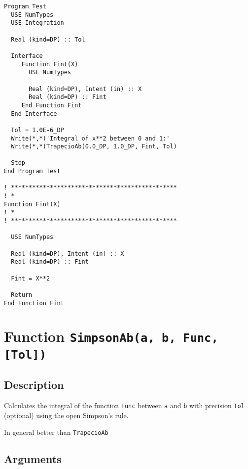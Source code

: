 \begin{lstlisting}[emph=TrapecioAB,
                   emphstyle=\color{blue},
                   frame=trBL,
                   caption=Integrating a function using the open
                   trapezoid rule.,
                   label=trapecioab]
Program Test
  USE NumTypes
  USE Integration

  Real (kind=DP) :: Tol

  Interface 
     Function Fint(X)
       USE NumTypes

       Real (kind=DP), Intent (in) :: X
       Real (kind=DP) :: Fint
     End Function Fint
  End Interface

  Tol = 1.0E-6_DP
  Write(*,*)'Integral of x**2 between 0 and 1:'
  Write(*,*)TrapecioAb(0.0_DP, 1.0_DP, Fint, Tol)

  Stop
End Program Test

! ***********************************************
! *
Function Fint(X)
! *  
! ***********************************************

  USE NumTypes

  Real (kind=DP), Intent (in) :: X
  Real (kind=DP) :: Fint

  Fint = X**2

  Return
End Function Fint
\end{lstlisting}


\section{Function \texttt{SimpsonAb(a, b, Func, [Tol])}}

\subsection{Description}

Calculates the integral of the function \texttt{Func} between
\texttt{a} and \texttt{b} with precision \texttt{Tol} (optional) using
the open Simpson's rule.

In general better than \texttt{TrapecioAb}

\subsection{Arguments}

